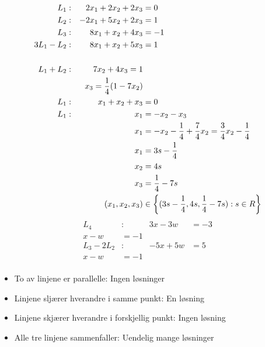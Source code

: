 \begin{align*}
  L_1 &:& 2x_1+2x_2+2x_3 &= 0 \\
  L_2 &:& -2x_1 +5x_2+2x_3 &= 1\\
  L_3 &:& 8x_1 + x_2 + 4x_3 &= -1\\
  3 L_1 -L_2 &:& 8x_1 + x_2 + 5x_3 &=1\\
  \\
  L_1 + L_2 &:& 7x_2 + 4x_3 = 1\\
      && x_3 = \frac{1}{4}(1-7x_2)\\
  L_1 &:& x_1 + x_2 + x_3 &= 0\\
  L_1 &:& x_1 &= -x_2-x_3\\
      && x_1 &= -x_2-\frac{1}{4}+\frac{7}{4}x_2 = \frac{3}{4}x_2-\frac{1}{4}\\
      && x_1 &= 3s-\frac{1}{4}\\
      && x_2 &= 4s\\
      && x_3 &= \frac{1}{4}-7s\\
  &&(x_1,x_2,x_3) &\in \left\{ (3s-\frac{1}{4}, 4s, \frac{1}{4}-7s) : s \in R \right \}
\end{align*}
\begin{align*}
  L_4&:& 3x-3w &= -3\\
  x-w &= -1\\
  L_3-2L_2 &:& -5x+5w &= 5\\
  x-w &= -1 \\
\end{align*}
\begin{itemize}
\item To av linjene er parallelle: Ingen løsninger
\item Linjene sljærer hverandre i samme punkt: En løsning
\item Linjene skjærer hverandre i forskjellig punkt: Ingen løsning
\item Alle tre linjene sammenfaller: Uendelig mange løsninger
  \end{itemize}




